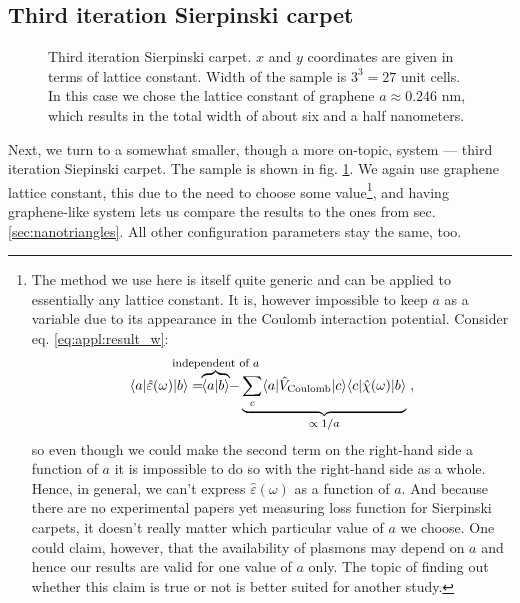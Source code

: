\documentclass[a4paper,12pt]{article}
\begin{document}
\subsection{Third iteration Sierpinski carpet}
    \begin{figure}[h]
    \vspace{-0.5cm}
    
    \caption{Third iteration Sierpinski carpet. $x$ and $y$ coordinates are given in terms of lattice constant. Width of the sample is $3^3 = 27$ unit cells. In this case we chose the lattice constant of graphene $a \approx 0.246$ nm, which results in the total width of about six and a half nanometers.}
    \label{fig:coordinates-3rd-SC}
    \end{figure}
    Next, we turn to a somewhat smaller, though a more on-topic, system --- third iteration Siepinski carpet. The sample is shown in fig. \ref{fig:coordinates-3rd-SC}. We again use graphene lattice constant, this due to the need to choose some value\footnote{%
    The method we use here is itself quite generic and can be applied to essentially any lattice constant. It is, however impossible to keep $a$ as a variable due to its appearance in the Coulomb interaction potential. Consider eq. \eqref{eq:appl:result_w}:
    \begin{equation*}
        \langle a | \hat\varepsilon(\omega) | b \rangle
            = \!\!\!\!\!\!\!\!\!\!\!\!\!\!\! \overbrace{\langle a | b \rangle}^\text{\footnotesize independent of $a$} \!\!\!\!\!\!\!\!\!\!\!\!\!\! - \underbrace{\sum_{c} \langle a | \hat V_\text{Coulomb} | c \rangle \langle c | \hat\chi(\omega) | b \rangle}_\text{\footnotesize $\propto 1/a$} \; ,
    \end{equation*}
    so even though we could make the second term on the right-hand side a function of $a$ it is impossible to do so with the right-hand side as a whole. Hence, in general, we can't express $\hat\varepsilon(\omega)$ as a function of $a$. And because there are no experimental papers yet measuring loss function for Sierpinski carpets, it doesn't really matter which particular value of $a$ we choose. One could claim, however, that the availability of plasmons may depend on $a$ and hence our results are valid for one value of $a$ only. The topic of finding out whether this claim is true or not is better suited for another study.},
    and having graphene-like system lets us compare the results to the ones from sec. \ref{sec:nanotriangles}. All other configuration parameters stay the same, too.
     
\end{document}

